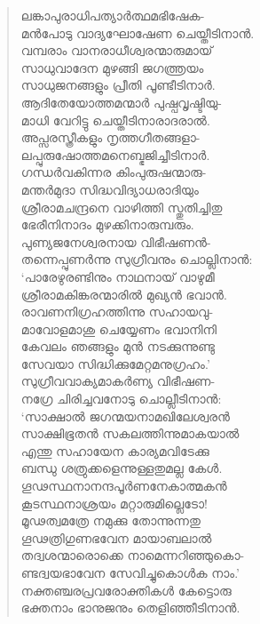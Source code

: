 \begin{verse}
ലങ്കാപുരാധിപത്യാര്‍ത്ഥമഭിഷേക-\\
മന്‍പോടു വാദ്യഘോഷേണ ചെയ്തീടിനാന്‍.\\
വമ്പരാം വാനരാധീശ്വരന്മാരുമായ്\\
സാധുവാദേന മുഴങ്ങി ജഗത്ത്രയം\\
സാധുജനങ്ങളും പ്രീതി പൂണ്ടീടിനാര്‍.\\
ആദിതേയോത്തമന്മാര്‍ പുഷ്പവൃഷ്ടിയു-\\
മാധി വേറിട്ടു ചെയ്തീടിനാരാദരാല്‍.\\
അപ്സരസ്ത്രീകളും നൃത്തഗീതങ്ങളാ-\\
ലപ്പുരുഷോത്തമനെബ്ഭജിച്ചീടിനാര്‍.\\
ഗന്ധര്‍വകിന്നര കിംപുരുഷന്മാരു-\\
മന്തര്‍മുദാ സിദ്ധവിദ്യാധരാദിയും\\
ശ്രീരാമചന്ദ്രനെ വാഴിത്തി സ്തുതിച്ചിതു\\
ഭേരീനിനാദം മുഴക്കിനാരുമ്പരും.\\
പുണ്യജനേശ്വരനായ വിഭീഷണന്‍-\\
തന്നെപ്പുണര്‍ന്നു സുഗ്രീവനും ചൊല്ലിനാന്‍:\\
‘പാരേഴുരണ്ടിനും നാഥനായ് വാഴുമീ\\
ശ്രീരാമകിങ്കരന്മാരില്‍ മുഖ്യന്‍ ഭവാന്‍.\\
രാവണനിഗ്രഹത്തിന്നു സഹായവു-\\
മാവോളമാശു ചെയ്യേണം ഭവാനിനി\\
കേവലം ഞങ്ങളും മുന്‍ നടക്കുന്നുണ്ടു\\
സേവയാ സിദ്ധിക്കുമേറ്റമനുഗ്രഹം.’\\
സുഗ്രീവവാക്യമാകര്‍ണ്യ വിഭീഷണ-\\
നഗ്രേ ചിരിച്ചവനോടു ചൊല്ലീടിനാന്‍:\\
‘സാക്ഷാല്‍ ജഗന്മയനാമഖിലേശ്വരന്‍\\
സാക്ഷിഭൂതന്‍ സകലത്തിന്നുമാകയാല്‍\\
എന്തു സഹായേന കാര്യമവിടേക്കു\\
ബന്ധു ശത്രുക്കളെന്നുള്ളതുമല്ല കേള്‍.\\
ഗൂഢസ്ഥനാനന്ദപൂര്‍ണനേകാത്മകന്‍\\
കൂടസ്ഥനാശ്രയം മറ്റാരുമില്ലെടോ!\\
മൂഢത്വമത്രേ നമുക്കു തോന്നുന്നതു\\
ഗൂഢത്രിഗുണഭവേന മായാബലാല്‍\\
തദ്വശന്മാരൊക്കെ നാമെന്നറിഞ്ഞുകൊ-\\
ണ്ടദ്വയഭാവേന സേവിച്ചുകൊള്‍ക നാം.’\\
നക്തഞ്ചരപ്രവരോക്തികള്‍ കേട്ടൊരു\\
ഭക്തനാം ഭാനുജനും തെളിഞ്ഞീടിനാന്‍.
\end{verse}

